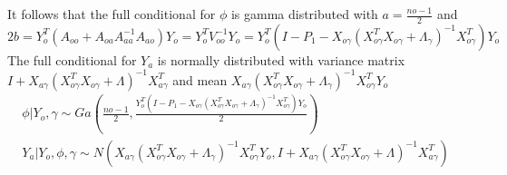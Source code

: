 \documentclass[9pt]{article}
\begin{document}
It follows that the full conditional for $\phi$ is gamma distributed with $a=\frac{no-1}{2}$ and $2b=Y_{o}^{T}(A_{oo}+A_{oa}A_{aa}^{-1}A_{ao})Y_{o}=Y_{o}^{T}V_{oo}^{-1}Y_{o}=Y_{o}^{T}(I-P_{1}-X_{o\gamma}(X_{o\gamma}^{T}X_{o\gamma}+\Lambda_{\gamma})^{-1}X_{o\gamma}^{T})Y_{o}$\\
The full conditional for $Y_{a}$ is normally distributed with variance matrix $I+X_{a\gamma}(X_{o\gamma}^{T}X_{o\gamma}+\Lambda)^{-1}X_{a\gamma}^{T}$ and mean $X_{a\gamma}(X_{o\gamma}^{T}X_{o\gamma}+\Lambda_{\gamma})^{-1}X_{o\gamma}^{T}Y_{o}$
\begin{align*}
	\phi|Y_{o},\gamma \sim Ga (\frac{no-1}{2}, \frac{Y_{o}^{T}(I-P_{1}-X_{o\gamma}(X_{o\gamma}^{T}X_{o\gamma}+\Lambda_{\gamma})^{-1}X_{o\gamma}^{T})Y_{o}}{2})\\
	Y_{a}|Y_{o},\phi,\gamma \sim N (X_{a\gamma}(X_{o\gamma}^{T}X_{o\gamma}+\Lambda_{\gamma})^{-1}X_{o\gamma}^{T}Y_{o},I+X_{a\gamma}(X_{o\gamma}^{T}X_{o\gamma}+\Lambda)^{-1}X_{a\gamma}^{T})
\end{align*}
\end{document}
